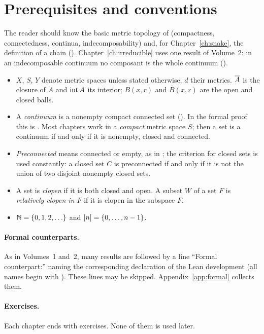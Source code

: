 \section{Prerequisites and conventions}

The reader should know the basic metric topology of  (compactness,
connectedness, continua, indecomposability) and, for Chapter~\ref{ch:snake}, the definition of a
chain (). Chapter~\ref{ch:irreducible} uses one result of Volume~2: in an
indecomposable continuum no composant is the whole continuum ().

\begin{itemize}
\item $X$, $S$, $Y$ denote metric spaces unless stated otherwise, $d$ their metrics. $\overline{A}$ is the
closure of $A$ and $\operatorname{int} A$ its interior; $B(x,r)$ and $\bar B(x,r)$ are the open and closed
balls.
\item A \emph{continuum} is a nonempty compact connected set (). In the
formal proof this is . Most chapters work in a \emph{compact}
metric space $S$; then a set is a continuum if and only if it is nonempty, closed and connected.
\item \emph{Preconnected} means connected or empty, as in ; the criterion
 for closed sets is used constantly: a closed set $C$ is preconnected if and only if
it is not the union of two disjoint nonempty closed sets.
\item A set is \emph{clopen} if it is both closed and open. A subset $W$ of a set $F$ is
\emph{relatively clopen in $F$} if it is clopen in the subspace $F$.
\item $\N=\set{0,1,2,\dots}$ and $[n]=\left\{ 0,\dots,n-1 \right\}$.
\end{itemize}

\paragraph{Formal counterparts.} As in Volumes~1 and~2, many results are followed by a line
``Formal counterpart:'' naming the corresponding declaration of the Lean development (all names
begin with ). These lines may be skipped. Appendix~\ref{app:formal} collects them.

\paragraph{Exercises.} Each chapter ends with exercises. None of them is used later.
